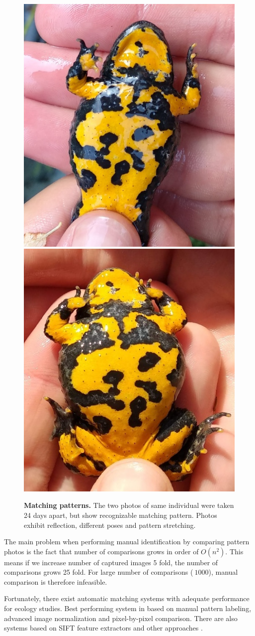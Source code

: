 \documentclass[fleqn,moreauthors,10pt]{ds_report}
\begin{document}
\begin{figure}[htb]\centering
	\includegraphics[width=0.49\linewidth]{hermiona_1.jpg}
	\includegraphics[width=0.49\linewidth]{hermiona_2.jpg}
	\caption{\textbf{Matching patterns.} The two photos of same individual were taken 24 days apart, but show recognizable matching pattern. Photos exhibit reflection, different poses and pattern stretching.}
	\label{fig:hermiona}
\end{figure}

The main problem when performing manual identification by comparing pattern photos is the fact that number of comparisons grows in order of $O(n^2)$. This means if we increase number of captured images 5 fold, the number of comparisons grows 25 fold. For large number of comparisons ($\>1000$), manual comparison is therefore infeasible.

Fortunately, there exist automatic matching systems with adequate performance for ecology studies. Best performing system in based on manual pattern labeling, advanced image normalization and pixel-by-pixel comparison. There are also systems based on SIFT feature extractors and other approaches \cite{ident_comparison}.
\end{document}
